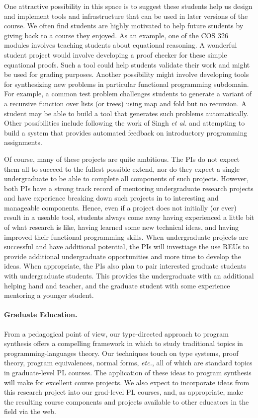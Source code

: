 One attractive possibility in this space is to suggest
these students help us design and implement tools and infrastructure
that can be used in later versions of the course.   We often find students
are highly motivated to help future students by giving back to a course
they enjoyed.  As an example,
one of the COS 326 modules involves teaching students about equational
reasoning.  A wonderful student project would involve developing a proof 
checker for these simple equational proofs.  Such a tool could help students
validate their work and might be used for grading purposes.
Another possibility might involve developing tools for synthesizing
new problems in particular functional programming subdomain.  For example,
a common test problem challenges students to generate a variant of a
recursive function over lists (or trees) using map and fold but no recursion.
A student may be able to build a tool that generates such problems 
automatically.  Other possibilities include following the work of 
Singh \emph{et al.} \cite{singh-pldi-2013} and attempting to build a system
that provides automated feedback on introductory programming assignments.

Of course, many of these projects are quite ambitious.  The PIs do not
expect them all to succeed to the fullest possible extend, nor do they
expect a single undergraduate to be able to complete all components of
such projects.  However, both PIs have a strong track record of mentoring
undergraduate research projects and have experience breaking down 
such projects in to interesting and manageable components.  
Hence, even if a project does not initially (or ever) result in a
useable tool, students always come away having experienced a little 
bit of what research is like, having learned some new technical ideas, and 
having improved their functional programming skills. When undergraduate 
projects are successful and have additional potential, the PIs will
investiage the use REUs to provide additional undergraduate opportunities
and more time to develop the ideas.
When appropriate, 
the PIs also plan to pair interested graduate students with undergraduate 
students.  This provides the undergraduate with
an additional helping hand and teacher, and the graduate student with
some experience mentoring a younger student.  


\paragraph*{Graduate Education.}
From a pedagogical point of view, our type-directed approach
to program synthesis offers a compelling framework in which to study
traditional topics in programming-languages theory.  Our techniques
touch on type systems, proof theory, program equivalences, normal
forms, \textit{etc.}, all of which are standard topics in graduate-level
PL courses.  The application of these ideas to program synthesis will make
for excellent course projects.  We also expect to incorporate ideas from
this research project into our grad-level PL courses, and, as
appropriate, make the resulting course components and projects
available to other educators in the field via the web.

